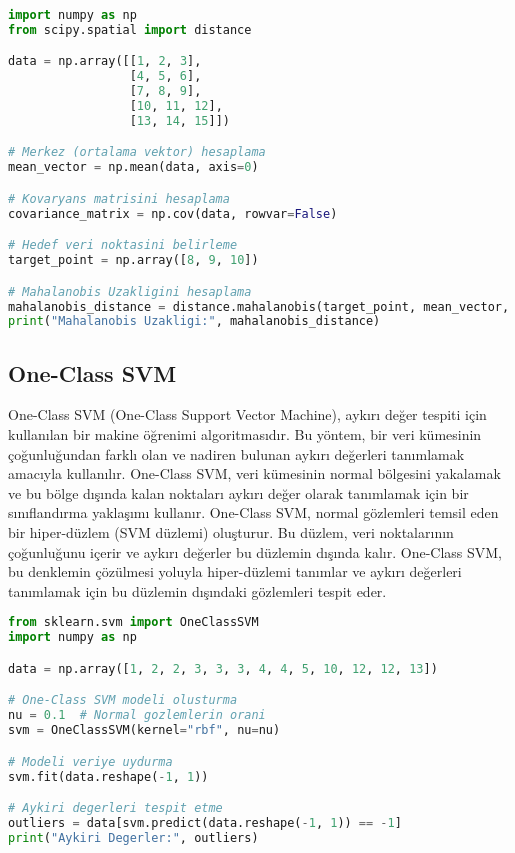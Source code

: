 \begin{lstlisting}[language=Python]
import numpy as np
from scipy.spatial import distance

data = np.array([[1, 2, 3],
                 [4, 5, 6],
                 [7, 8, 9],
                 [10, 11, 12],
                 [13, 14, 15]])

# Merkez (ortalama vektor) hesaplama
mean_vector = np.mean(data, axis=0)

# Kovaryans matrisini hesaplama
covariance_matrix = np.cov(data, rowvar=False)

# Hedef veri noktasini belirleme
target_point = np.array([8, 9, 10])

# Mahalanobis Uzakligini hesaplama
mahalanobis_distance = distance.mahalanobis(target_point, mean_vector, np.linalg.inv(covariance_matrix))
print("Mahalanobis Uzakligi:", mahalanobis_distance)
\end{lstlisting}

\subsection{One-Class SVM}
One-Class SVM (One-Class Support Vector Machine), aykırı değer tespiti için kullanılan bir makine öğrenimi algoritmasıdır. Bu yöntem, bir veri kümesinin çoğunluğundan farklı olan ve nadiren bulunan aykırı değerleri tanımlamak amacıyla kullanılır. One-Class SVM, veri kümesinin normal bölgesini yakalamak ve bu bölge dışında kalan noktaları aykırı değer olarak tanımlamak için bir sınıflandırma yaklaşımı kullanır. One-Class SVM, normal gözlemleri temsil eden bir hiper-düzlem (SVM düzlemi) oluşturur. Bu düzlem, veri noktalarının çoğunluğunu içerir ve aykırı değerler bu düzlemin dışında kalır. One-Class SVM, bu denklemin çözülmesi yoluyla hiper-düzlemi tanımlar ve aykırı değerleri tanımlamak için bu düzlemin dışındaki gözlemleri tespit eder.

\begin{lstlisting}[language=Python]
from sklearn.svm import OneClassSVM
import numpy as np

data = np.array([1, 2, 2, 3, 3, 3, 4, 4, 5, 10, 12, 12, 13])

# One-Class SVM modeli olusturma
nu = 0.1  # Normal gozlemlerin orani
svm = OneClassSVM(kernel="rbf", nu=nu)

# Modeli veriye uydurma
svm.fit(data.reshape(-1, 1))

# Aykiri degerleri tespit etme
outliers = data[svm.predict(data.reshape(-1, 1)) == -1]
print("Aykiri Degerler:", outliers)
\end{lstlisting}

